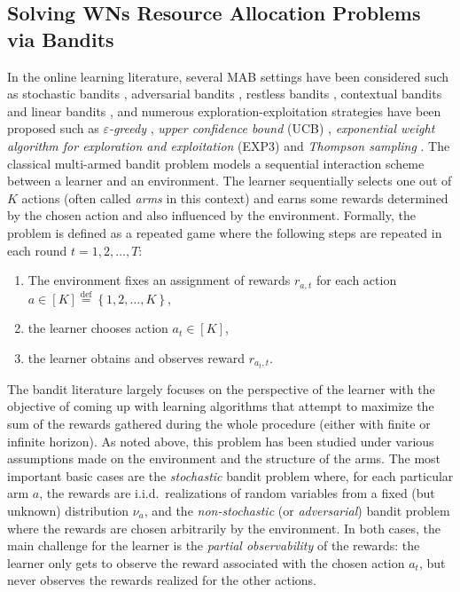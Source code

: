 \documentclass[preprint,12pt]{elsarticle}
\begin{document}
\subsection{Solving WNs Resource Allocation Problems via Bandits}
\label{section:previous_work}
In the online learning literature, several MAB settings have been considered such as stochastic bandits \cite{thompson1933likelihood,lai1985asymptotically,auer2002finite}, adversarial bandits \cite{auer1995gambling,auer2002nonstochastic}, restless bandits \cite{whittle1988restless}, contextual bandits \cite{LCLS10} and linear bandits \cite{abe2003reinforcement,APS11}, and numerous exploration-exploitation strategies have been proposed such as \textit{$\varepsilon$-greedy} \cite{sutton1998reinforcement,auer2002finite}, \textit{upper confidence bound} (UCB) \cite{lai1985asymptotically,Agr95,BuKa96,auer2002finite}, \textit{exponential weight algorithm for exploration and exploitation} (EXP3) \cite{auer1995gambling,auer2002finite} and \textit{Thompson sampling} \cite{thompson1933likelihood}. The classical multi-armed bandit problem models a sequential interaction scheme between a learner and an environment. The learner sequentially selects one out of $K$ actions (often called \emph{arms} in this context) and earns some rewards determined by the chosen action and also influenced by the environment. Formally, the problem 
is defined as a repeated game where the following steps are repeated in each round $t=1,2,\dots,T$:
\begin{enumerate}
	\item The environment fixes an assignment of rewards $r_{a,t}$ for each action $a\in[K] \stackrel{\text{def}}{=} \left\{1,2,\dots,K\right\}$,
	\item the learner chooses action $a_t\in[K]$,
	\item the learner obtains and observes reward $r_{a_t,t}$.
\end{enumerate}
The bandit literature largely focuses on the perspective of the learner with the objective of coming up with learning algorithms that attempt to maximize the sum of the rewards gathered during the whole procedure (either with finite or infinite horizon). As noted above, this problem has been studied under various assumptions made on the environment and the structure of the arms. The most important basic cases are the \emph{stochastic} bandit problem where, for each particular arm $a$, the rewards are i.i.d.~realizations of random variables from a fixed (but unknown) distribution $\nu_a$, and the \emph{non-stochastic} (or \emph{adversarial}) bandit problem where the rewards are chosen arbitrarily by the environment. In both cases, the main challenge for the learner is the \emph{partial observability} of the rewards: the learner only gets to observe the reward associated with the chosen action $a_t$, but never observes the rewards realized for the other actions.
\end{document}
